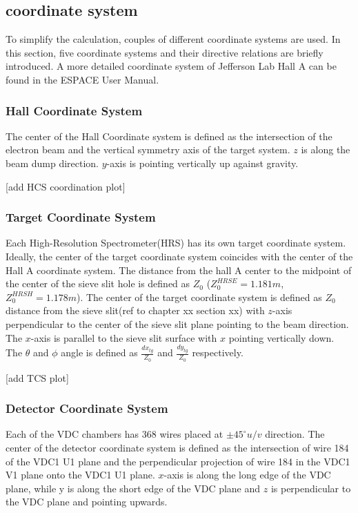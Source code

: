\subsection{coordinate system}


To simplify the calculation, couples of different coordinate systems are used. In this section, five coordinate systems and their directive relations are briefly introduced. A more detailed coordinate system of Jefferson Lab Hall A can be found in the ESPACE User Manual\cite{espace2002manual}.  

\subsubsection{Hall Coordinate System}
The center of the Hall Coordinate system is defined as the intersection of the electron beam and the vertical symmetry axis of the target system. $z$ is along the beam dump direction. $y$-axis is pointing vertically up against gravity.

[add HCS coordination plot]

\subsubsection{Target Coordinate System}

Each High-Resolution Spectrometer(HRS) has its own target coordinate system. Ideally, the center of the target coordinate system coincides with the center of the Hall A coordinate system. The distance from the hall A center to the midpoint of the center of the sieve slit hole is defined as $Z_0$ ($Z^{HRSE}_0 = 1.181 m$, $Z^{HRSH}_0 = 1.178 m$). The center of the target coordinate system is defined as $Z_0$ distance from the sieve slit(ref to chapter xx section xx) with $z$-axis perpendicular to the center of the sieve slit plane pointing to the beam direction. The $x$-axis is parallel to the sieve slit surface with $x$ pointing vertically down. The $\theta$ and $\phi$ angle is defined as $\frac{dx_{tg}}{Z_0}$ and $\frac{dy_{tg}}{Z_0}$ respectively.

[add TCS plot]


\subsubsection{Detector Coordinate System}

Each of the VDC chambers has 368 wires placed at $\pm 45 ^{\circ} u/v$ direction. The center of the detector coordinate system is defined as the intersection of wire 184 of the VDC1 U1 plane and the perpendicular projection of wire 184 in the VDC1 V1 plane onto the VDC1 U1 plane. $x$-axis is along the long edge of the VDC plane, while y is along the short edge of the VDC plane and $z$ is perpendicular to the VDC plane and pointing upwards. 

